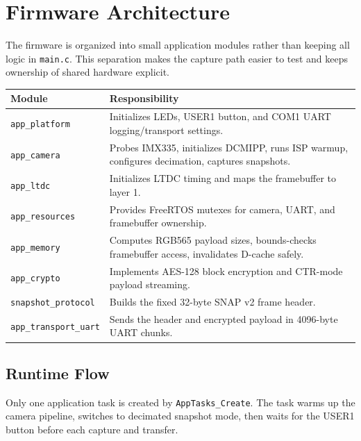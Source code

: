 \documentclass[11pt,a4paper]{article}
\begin{document}
\section{Firmware Architecture}
The firmware is organized into small application modules rather than keeping all
logic in \texttt{main.c}. This separation makes the capture path easier to test
and keeps ownership of shared hardware explicit.

\begin{tabularx}{\textwidth}{@{}lX@{}}
\toprule
\textbf{Module} & \textbf{Responsibility} \\
\midrule
\texttt{app\_platform} & Initializes LEDs, USER1 button, and COM1 UART logging/transport settings. \\
\texttt{app\_camera} & Probes IMX335, initializes DCMIPP, runs ISP warmup, configures decimation, captures snapshots. \\
\texttt{app\_ltdc} & Initializes LTDC timing and maps the framebuffer to layer 1. \\
\texttt{app\_resources} & Provides FreeRTOS mutexes for camera, UART, and framebuffer ownership. \\
\texttt{app\_memory} & Computes RGB565 payload sizes, bounds-checks framebuffer access, invalidates D-cache safely. \\
\texttt{app\_crypto} & Implements AES-128 block encryption and CTR-mode payload streaming. \\
\texttt{snapshot\_protocol} & Builds the fixed 32-byte SNAP v2 frame header. \\
\texttt{app\_transport\_uart} & Sends the header and encrypted payload in 4096-byte UART chunks. \\
\bottomrule
\end{tabularx}

\subsection{Runtime Flow}
Only one application task is created by \texttt{AppTasks\_Create}. The task
warms up the camera pipeline, switches to decimated snapshot mode, then waits
for the USER1 button before each capture and transfer.
\end{document}
